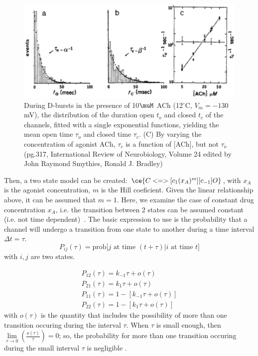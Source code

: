 \begin{figure}[htb]
  \centerline{\includegraphics[height=5cm]{./images/mean_open_close_time.eps}}
  \caption{During D-bursts in the presence of 10$\muM$ ACh (12$^\circ$C,
  $V_m=-130$mV), the distribution of the duration open $t_o$ and closed $t_c$ of
  the channels, fitted with a single
  exponential functions, yielding the mean open
  time $\tau_o$ and closed time $\tau_c$. (C)
  By varying the concentration of agonist ACh,
  $\tau_c$ is a function of [ACh], but not
  $\tau_o$ (pg.317, International Review of Neurobiology, Volume 24 edited by John
  Raymond Smythies, Ronald J. Bradley)}
\label{fig:mean_open_close_time}
\end{figure}

Then, a two state model can be created: $\ce{C <=>[c_1(x_A)^m][c_{-1}] O}$,
with $x_A$ is the agonist concentration, $m$ is the Hill coeficient. Given the
linear relationship above, it can be assumed that $m=1$. Here, we examine the
case of constant drug concentration $x_A$, i.e. the transition between 2 states
can be assumed constant (i.e. not time dependent)~\citep{colquhoun1977rfm}.
The basic expression to use is the probability that a channel will undergo a
transition from one state to another during a time interval $\Delta t=\tau$.
\begin{equation}
P_{ij}(\tau) = \text{prob[$j$ at time $(t+\tau) | i$ at time $t$]}
\end{equation}
with $i, j$	are two states.

\begin{eqnarray}
P_{12}(\tau) = k_{-1}\tau + o(\tau)\\
P_{21}(\tau) = k_{1}\tau + o(\tau) \\
P_{11}(\tau) = 1 - \left[ k_{-1}\tau + o(\tau) \right] \\
P_{22}(\tau) = 1 - \left[ k_{1}\tau + o(\tau) \right]
\end{eqnarray}
with $o(\tau)$ is the quantity that includes the possibility of more than one
transition occuring during the interval $\tau$. When $\tau$ is small enough,
then $\lim\limits_{\tau\rightarrow 0}\left(\frac{o(\tau)}{\tau} \right) = 0$;
so, the probability for more than one  transition occuring during the small
interval $\tau$ is negligible  \citep{cox1965}.

